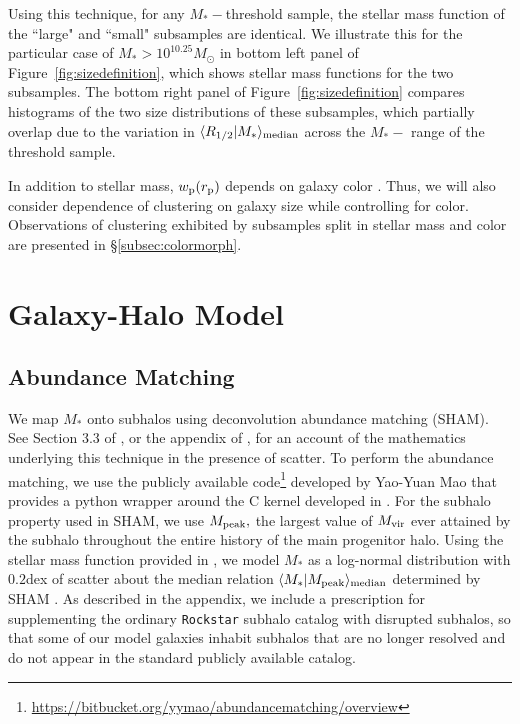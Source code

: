 \documentclass[usenatbib,usegraphicx,letterpaper]{mn2e}
\newcommand{\rhalf}{R_{1/2}}
\newcommand{\mstar}{M_{\ast}}
\newcommand{\mvir}{M_{\rm vir}}
\newcommand{\mpeak}{M_{\rm peak}}
\newcommand{\rproj}{r_{\rm p}}
\newcommand{\wproj}{w_{\rm p}}
\newcommand{\median}[2]{\langle{#1}\vert{#2}\rangle_{\rm median}}
\newcommand{\msun}{M_\odot}
\begin{document}
Using this technique, for any $\mstar-$threshold sample, the stellar mass function of the ``large" and ``small" subsamples are identical. We illustrate this for the particular case of $\mstar>10^{10.25}\msun$ in bottom left panel of Figure~\ref{fig:sizedefinition}, which shows stellar mass functions for the two subsamples. The bottom right panel of Figure~\ref{fig:sizedefinition} compares histograms of the two size distributions of these subsamples, which partially overlap due to the variation in $\median{\rhalf}{\mstar}$ across the $\mstar-$ range of the threshold sample.

In addition to stellar mass, $\wproj(\rproj)$ depends on galaxy color \citep[e.g.,][]{zehavi_etal11}. Thus, we will also consider
dependence of clustering on galaxy size while controlling for color. Observations of clustering exhibited by subsamples split in stellar mass and color are presented in \S\ref{subsec:colormorph}.

\section{Galaxy-Halo Model}
\label{sec:model}

\subsection{Abundance Matching}
\label{subsec:sham}

We map $\mstar$ onto subhalos using deconvolution abundance matching (SHAM). See Section 3.3 of \citet{behroozi_etal10}, or the appendix of \citet{kravtsov_etal14}, for an account of the mathematics underlying this technique in the presence of scatter. To perform the abundance matching, we use the publicly available code\footnote{\url{https://bitbucket.org/yymao/abundancematching/overview}} developed by Yao-Yuan Mao \citep{lehmann_etal15} that provides a python wrapper around the C kernel developed in \citet{behroozi_etal10}. For the subhalo property used in SHAM, we use $\mpeak,$ the largest value of $\mvir$ ever attained by the subhalo throughout the entire history of the main progenitor halo.  Using the stellar mass function provided in \citet{moustakas_etal13}, we model $\mstar$ as a log-normal distribution with $0.2$dex of scatter about the median relation $\median{\mstar}{\mpeak}$ determined by SHAM \citep{reddick_etal13}. As described in the appendix, we include a prescription for supplementing the ordinary {\tt Rockstar} subhalo catalog with disrupted subhalos, so that some of our model galaxies inhabit subhalos that are no longer resolved and do not appear in the standard publicly available catalog.
\end{document}

